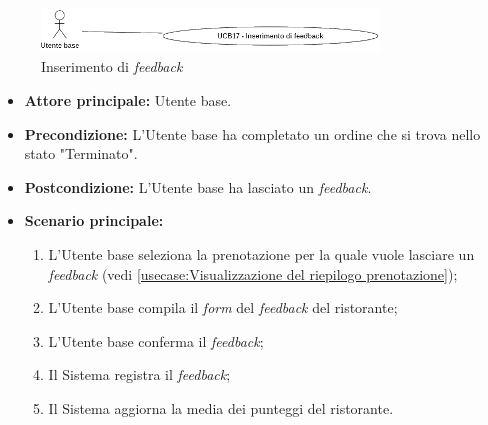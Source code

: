 \newpage
{}
\label{usecase:Inserimento di feedback}

\begin{figure}[h]
	\centering
	\includegraphics[width=0.8\textwidth]{./uml/UCB17.png} 
	\caption{Inserimento di \textit{feedback}}
	\label{fig:UCB16}
  \end{figure}

\begin{itemize}
	\item \textbf{Attore principale:} Utente base.

	\item \textbf{Precondizione:} L'Utente base ha completato un ordine che si
	      trova nello stato "Terminato".

	\item \textbf{Postcondizione:} L'Utente base ha lasciato un \textit{feedback}.

	\item \textbf{Scenario principale:}
	      \begin{enumerate}
		      \item L'Utente base seleziona la prenotazione per la quale vuole
		            lasciare un \textit{feedback} (vedi
		            \autoref{usecase:Visualizzazione del riepilogo prenotazione});

		      \item L'Utente base compila il \textit{form} del \textit{feedback} del ristorante;

		      \item L'Utente base conferma il \textit{feedback};

		      \item Il Sistema registra il \textit{feedback};

		      \item Il Sistema aggiorna la media dei punteggi del ristorante.

	      \end{enumerate}
\end{itemize}
